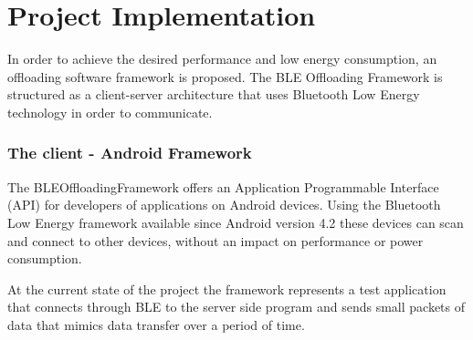 \chapter{Project Implementation}
\label{chapter:implementation}

In order to achieve the desired performance and low energy consumption, an offloading software framework is proposed. The BLE Offloading Framework is structured as a client-server architecture that uses Bluetooth Low Energy technology in order to communicate.

\subsection{The client - Android Framework}

The BLEOffloadingFramework offers an Application Programmable Interface (API) for developers of applications on Android devices. Using the Bluetooth Low Energy framework available since Android version 4.2 these devices can scan and connect to other devices, without an impact on performance or power consumption.

At the current state of the project the framework represents a test application that connects through BLE to the server side program and sends small packets of data that mimics data transfer over a period of time.



